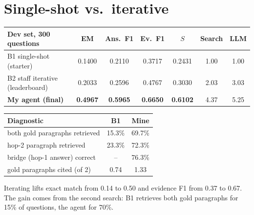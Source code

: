 \documentclass[10pt,a4paper]{article}
\begin{document}
\section{Single-shot vs.\ iterative}
\begin{minipage}[t]{0.585\textwidth}
\vspace{0pt}
\centering\footnotesize
\begin{tabular}{@{}lcccccc@{}}
\toprule
Dev set, 300 questions & EM & Ans.\ F1 & Ev.\ F1 & $S$ & Search & LLM\\
\midrule
B1 single-shot (starter) & 0.1400 & 0.2110 & 0.3717 & 0.2431 & 1.00 & 1.00\\
B2 staff iterative (leaderboard) & 0.2033 & 0.2596 & 0.4767 & 0.3030 & 2.03 & 3.03\\
\textbf{My agent (final)} & \textbf{0.4967} & \textbf{0.5965} & \textbf{0.6650} & \textbf{0.6102} & 4.37 & 5.25\\
\bottomrule
\end{tabular}
\label{tab:main}
\end{minipage}\hfill
\begin{minipage}[t]{0.395\textwidth}
\vspace{0pt}
\centering\footnotesize
\begin{tabular}{@{}lcc@{}}
\toprule
Diagnostic & B1 & Mine\\
\midrule
both gold paragraphs retrieved & 15.3\% & 69.7\%\\
hop-2 paragraph retrieved & 23.3\% & 72.3\%\\
bridge (hop-1 answer) correct & -- & 76.3\%\\
gold paragraphs cited (of 2) & 0.74 & 1.33\\
\bottomrule
\end{tabular}
\end{minipage}

\smallskip
Iterating lifts exact match from 0.14 to 0.50 and evidence F1 from 0.37 to 0.67. The gain comes from the second
search: B1 retrieves both gold paragraphs for 15\% of questions, the agent for 70\%.

\vfill
\end{document}
